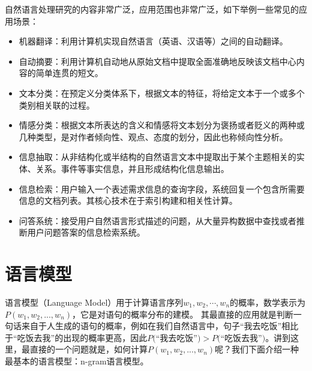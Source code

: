 \documentclass[graybox,envcountchap,sectrefs]{svmono}
\begin{document}
自然语言处理研究的内容非常广泛，应用范围也非常广泛，如下举例一些常见的应用场景：
\begin{itemize}
\item 机器翻译：利用计算机实现自然语言（英语、汉语等）之间的自动翻译。
\item 自动摘要：利用计算机自动地从原始文档中提取全面准确地反映该文档中心内容的简单连贯的短文。
\item 文本分类：在预定义分类体系下，根据文本的特征，将给定文本于一个或多个类别相关联的过程。
\item 情感分类：根据文本所表达的含义和情感将文本划分为褒扬或者贬义的两种或几种类型，是对作者倾向性、观点、态度的划分，因此也称倾向性分析。
\item 信息抽取：从非结构化或半结构的自然语言文本中提取出于某个主题相关的实体、关系。事件等事实信息，并且形成结构化信息输出。
\item 信息检索：用户输入一个表述需求信息的查询字段，系统回复一个包含所需要信息的文档列表。其核心技术在于索引构建和相关性计算。
\item 问答系统：接受用户自然语言形式描述的问题，从大量异构数据中查找或者推断用户问题答案的信息检索系统。
\end{itemize}


\section{语言模型}

语言模型（Language Model）用于计算语言序列$w_1, w_2, \cdots, w_n$的概率，数学表示为$P(w_1, w_2, ..., w_n)$，它是对语句的概率分布的建模。
其最直接的应用就是判断一句话来自于人生成的语句的概率，例如在我们自然语言中，句子``我去吃饭''相比于``吃饭去我''的出现的概率更高，因此$P($``我去吃饭''$) > P($``吃饭去我''$)$。讲到这里，最直接的一个问题就是，如何计算$P(w_1, w_2, ..., w_n)$呢？我们下面介绍一种最基本的语言模型：n-gram语言模型。
\end{document}

